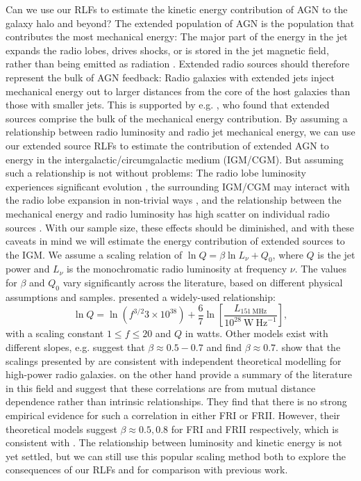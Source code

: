       Can we use our RLFs to estimate the kinetic energy contribution of AGN to the galaxy halo and beyond? The extended population of AGN is the population that contributes the most mechanical energy: The major part of the energy in the jet expands the radio lobes, drives shocks, or is stored in the jet magnetic field, rather than being emitted as radiation \citep{godfrey16power, hardcastle14lobes}. Extended radio sources should therefore represent the bulk of AGN feedback: Radio galaxies with extended jets inject mechanical energy out to larger distances from the core of the host galaxies than those with smaller jets. This is supported by e.g. \citet{turner15agn}, who found that extended sources comprise the bulk of the mechanical energy contribution. By assuming a relationship between radio luminosity and radio jet mechanical energy, we can use our extended source RLFs to estimate the contribution of extended AGN to energy in the intergalactic/circumgalactic medium (IGM/CGM). But assuming such a relationship is not without problems: The radio lobe luminosity experiences significant evolution \citep[e.g.][]{bicknell97css}, the surrounding IGM/CGM may interact with the radio lobe expansion in non-trivial ways \citep[e.g.][]{hardcastle13lobes}, and the relationship between the mechanical energy and radio luminosity has high scatter on individual radio sources \citep{hardcastle13lobes}. With our sample size, these effects should be diminished, and with these caveats in mind we will estimate the energy contribution of extended sources to the IGM. We assume a scaling relation of $\ln Q = \beta \ln L_\nu + Q_0$, where $Q$ is the jet power and $L_\nu$ is the monochromatic radio luminosity at frequency $\nu$. The values for $\beta$ and $Q_0$ vary significantly across the literature, based on different physical assumptions and samples. \citet{willott99radio} presented a widely-used relationship:
      \begin{equation}
        \ln Q = \ln (f^{3/2} 3 \times 10^{38}) + \frac{6}{7} \ln \left[\frac{L_{151~\mathrm{MHz}}}{10^{28}~\mathrm{W\ Hz}^{-1}}\right],
      \end{equation}
      with a scaling constant $1 \leq f \leq 20$ and $Q$ in watts. Other models exist with different slopes, e.g. \citet{birzan08power} suggest that $\beta \approx 0.5 - 0.7$ and \citet{cavagnolo10relation} find $\beta \approx 0.7$. \citet{shabala13power} show that the scalings presented by \citet{willott99radio} are consistent with independent theoretical modelling for high-power radio galaxies. \citet{godfrey16power} on the other hand provide a summary of the literature in this field and suggest that these correlations are from mutual distance dependence rather than intrinsic relationships. They find that there is no strong empirical evidence for such a correlation in either FRI or FRII. However, their theoretical models suggest $\beta \approx 0.5,0.8$ for FRI and FRII respectively, which is consistent with \citet{willott99radio}. The relationship between luminosity and kinetic energy is not yet settled, but we can still use this popular scaling method both to explore the consequences of our RLFs and for comparison with previous work.


